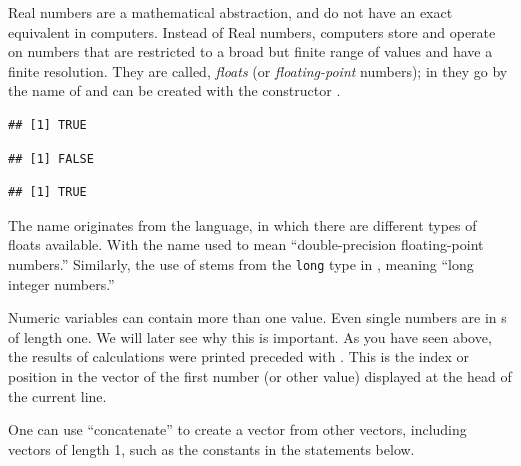 \documentclass[krantz2]{krantz}\usepackage{knitr}
\begin{document}
\begin{explainbox}
Real numbers are a mathematical abstraction, and do not have an exact equivalent in computers. Instead of Real numbers, computers store and operate on numbers that are restricted to a broad but finite range of values and have a finite resolution. They are called, \emph{floats} (or \emph{floating-point} numbers); in \Rlang they go by the name of  and can be created with the constructor .

\begin{knitrout}\footnotesize
{}\color{fgcolor}\begin{kframe}
\begin{alltt}
\hlstd{(}\hlstd{)}
\end{alltt}
\begin{verbatim}
## [1] TRUE
\end{verbatim}
\begin{alltt}
\hlstd{(}\hlstd{)}
\end{alltt}
\begin{verbatim}
## [1] FALSE
\end{verbatim}
\begin{alltt}
\hlstd{(}\hlstd{)}
\end{alltt}
\begin{verbatim}
## [1] TRUE
\end{verbatim}
\end{kframe}
\end{knitrout}

The name  originates from the \Clang language, in which there are different types of floats available. With the name  used to mean ``double-precision floating-point numbers.'' Similarly, the use of  stems from the \texttt{long} type in \Clang, meaning ``long integer numbers.''
\end{explainbox}

Numeric variables can contain more than one value. Even single numbers are in \Rlang {}s of length one. We will later see why this is important. As you have seen above, the results of calculations were printed preceded with \code{[1]}. This is the index or position in the vector of the first number (or other value) displayed at the head of the current line.

One can use  ``concatenate'' to create a vector from other vectors, including vectors of length 1, such as the  constants in the statements below.
\end{document}
